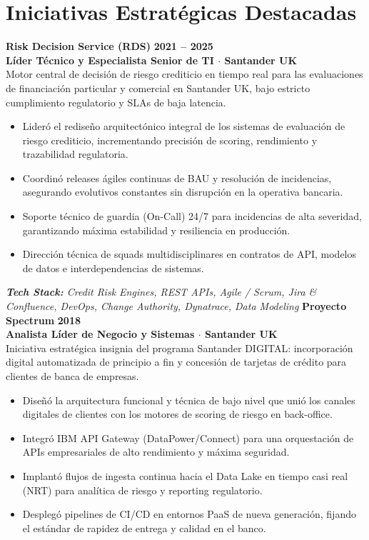 \documentclass[10pt,a4paper]{article}
\begin{document}
\section{Iniciativas Estratégicas Destacadas}
\noindent\textbf{\large Risk Decision Service (RDS)} \hfill {\color{SynthBlue}\textbf{2021 -- 2025}} \\
{\color{SynthPink}\textbf{Líder Técnico y Especialista Senior de TI $\cdot$ Santander UK}} \\
\vspace{2pt}
Motor central de decisión de riesgo crediticio en tiempo real para las evaluaciones de financiación particular y comercial en Santander UK, bajo estricto cumplimiento regulatorio y SLAs de baja latencia.
\begin{itemize}[leftmargin=1.5em, itemsep=1.5pt, topsep=2pt]
    \item Lideró el rediseño arquitectónico integral de los sistemas de evaluación de riesgo crediticio, incrementando precisión de scoring, rendimiento y trazabilidad regulatoria.
    \item Coordinó releases ágiles continuas de BAU y resolución de incidencias, asegurando evolutivos constantes sin disrupción en la operativa bancaria.
    \item Soporte técnico de guardia (On-Call) 24/7 para incidencias de alta severidad, garantizando máxima estabilidad y resiliencia en producción.
    \item Dirección técnica de squads multidisciplinares en contratos de API, modelos de datos e interdependencias de sistemas.
\end{itemize}
\noindent\textit{\footnotesize \textbf{Tech Stack:} Credit Risk Engines, REST APIs, Agile / Scrum, Jira \& Confluence, DevOps, Change Authority, Dynatrace, Data Modeling}
\vspace{10pt}
\noindent\textbf{\large Proyecto Spectrum} \hfill {\color{SynthBlue}\textbf{2018}} \\
{\color{SynthPink}\textbf{Analista Líder de Negocio y Sistemas $\cdot$ Santander UK}} \\
\vspace{2pt}
Iniciativa estratégica insignia del programa Santander DIGITAL: incorporación digital automatizada de principio a fin y concesión de tarjetas de crédito para clientes de banca de empresas.
\begin{itemize}[leftmargin=1.5em, itemsep=1.5pt, topsep=2pt]
    \item Diseñó la arquitectura funcional y técnica de bajo nivel que unió los canales digitales de clientes con los motores de scoring de riesgo en back-office.
    \item Integró IBM API Gateway (DataPower/Connect) para una orquestación de APIs empresariales de alto rendimiento y máxima seguridad.
    \item Implantó flujos de ingesta continua hacia el Data Lake en tiempo casi real (NRT) para analítica de riesgo y reporting regulatorio.
    \item Desplegó pipelines de CI/CD en entornos PaaS de nueva generación, fijando el estándar de rapidez de entrega y calidad en el banco.
\end{itemize}
\end{document}
